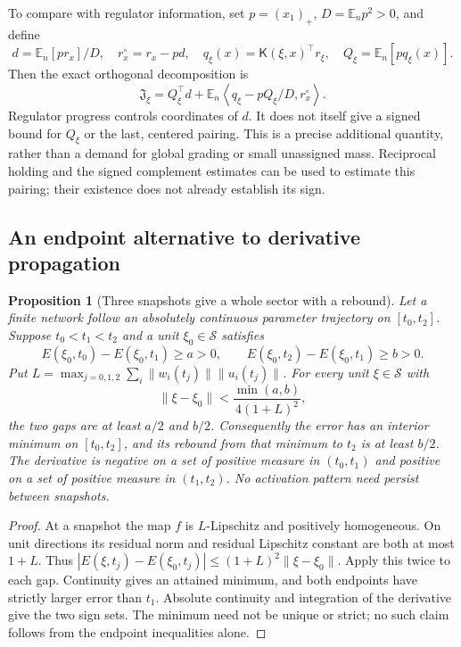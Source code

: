 \documentclass[11pt]{article}
\newtheorem{proposition}[theorem]{Proposition}
\theoremstyle{remark}
\begin{document}
To compare with regulator information, set $p=(x_1)_+$,
$D=\mathbb E_n p^2>0$, and define
\[
 d=\mathbb E_n[pr_x]/D,\quad r_x^\circ=r_x-pd,\quad
 q_\xi(x)=\mathsf K(\xi,x)^\top r_\xi,\quad
 Q_\xi=\mathbb E_n[pq_\xi(x)].
\]
Then the exact orthogonal decomposition is
\begin{equation}\label{sbaudit:regulator-split}
 \mathfrak J_\xi=Q_\xi^\top d+
 \mathbb E_n\left\langle q_\xi-pQ_\xi/D,r_x^\circ\right\rangle.
\end{equation}
Regulator progress controls coordinates of $d$. It does not itself give
a signed bound for $Q_\xi$ or the last, centered pairing. This is a precise
additional quantity, rather than a demand for global grading or small
unassigned mass. Reciprocal holding and the signed complement estimates
can be used to estimate this pairing; their existence does not already
establish its sign.

\subsection{An endpoint alternative to derivative propagation}

\begin{proposition}[Three snapshots give a whole sector with a rebound]
\label{sbaudit:secants}
Let a finite network follow an absolutely continuous parameter trajectory
on $[t_0,t_2]$. Suppose $t_0<t_1<t_2$ and a unit $\xi_0\in\mathcal S$
satisfies
\begin{equation}\label{sbaudit:two-gaps}
 E(\xi_0,t_0)-E(\xi_0,t_1)\ge a>0,\qquad
 E(\xi_0,t_2)-E(\xi_0,t_1)\ge b>0.
\end{equation}
Put $L=\max_{j=0,1,2}\sum_i\|w_i(t_j)\|\|u_i(t_j)\|$.
For every unit $\xi\in\mathcal S$ with
\[
 \|\xi-\xi_0\|<\frac{\min(a,b)}{4(1+L)^2},
\]
the two gaps are at least $a/2$ and $b/2$. Consequently the error has an
interior minimum on $[t_0,t_2]$, and its rebound from that minimum to $t_2$
is at least $b/2$. The derivative is negative on a set of positive measure
in $(t_0,t_1)$ and positive on a set of positive measure in $(t_1,t_2)$.
No activation pattern need persist between snapshots.
\end{proposition}
\begin{proof}
At a snapshot the map $f$ is $L$-Lipschitz and positively homogeneous.
On unit directions its residual norm and residual Lipschitz constant are
both at most $1+L$. Thus
$|E(\xi,t_j)-E(\xi_0,t_j)|\le(1+L)^2\|\xi-\xi_0\|$.
Apply this twice to each gap. Continuity gives an attained minimum,
and both endpoints have strictly larger error than $t_1$. Absolute
continuity and integration of the derivative give the two sign sets.
The minimum need not be unique or strict; no such claim follows from
the endpoint inequalities alone.
\end{proof}
\end{document}
